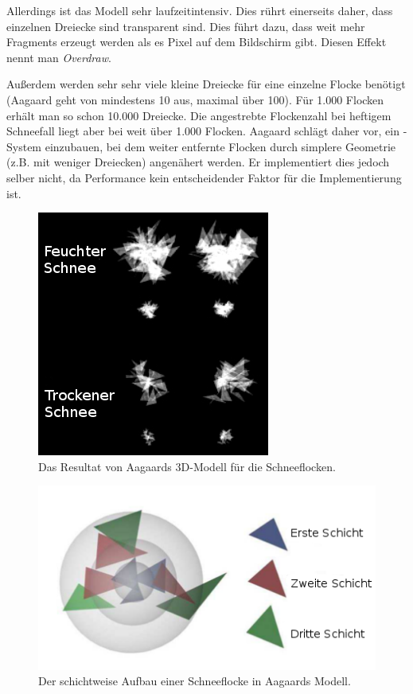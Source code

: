 Allerdings ist das Modell sehr laufzeitintensiv. Dies rührt einerseits
daher, dass einzelnen Dreiecke sind transparent sind. Dies führt dazu,
dass weit mehr Fragments erzeugt werden als es Pixel auf dem
Bildschirm gibt. Diesen Effekt nennt man \emph{Overdraw}.

Außerdem werden sehr sehr viele kleine Dreiecke für eine einzelne
Flocke benötigt (Aagaard geht von mindestens 10 aus, maximal über
100). Für 1.000 Flocken erhält man so schon 10.000 Dreiecke. Die
angestrebte Flockenzahl bei heftigem Schneefall liegt aber bei weit
über 1.000 Flocken. Aagaard schlägt daher vor, ein -System einzubauen, bei dem weiter entfernte Flocken durch
simplere Geometrie (z.B. mit weniger Dreiecken) angenähert werden. Er
implementiert dies jedoch selber nicht, da Performance kein
entscheidender Faktor für die Implementierung ist.

\begin{figure}[ht]
    \centering
    \includegraphics{images/aagaard_layer_model}
    \caption{Das Resultat von Aagaards 3D-Modell für die Schneeflocken.}
    \label{fig:implementation_aagaard_layer_model}
\end{figure}

\begin{figure}[ht]
    \centering
    \includegraphics{images/aagaard_spheres}
    \caption{Der schichtweise Aufbau einer Schneeflocke in Aagaards Modell.}
    \label{fig:implementation_aagaard_spheres}
\end{figure}

